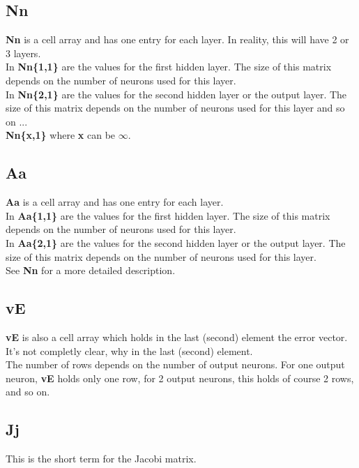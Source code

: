 \subsection{Nn}
\textbf{Nn} is a cell array and has one entry for each layer. In reality, this will have 2 or 3 layers.\\
In \textbf{Nn\{1,1\}} are the values for the first hidden layer. The size of this matrix depends
on the number of neurons used for this layer.\\
In \textbf{Nn\{2,1\}} are the values for the second hidden layer or the output layer. The size of this matrix depends
on the number of neurons used for this layer and so on ...\\
\textbf{Nn\{x,1\}} where \textbf{x} can be $\infty$.\\

\subsection{Aa}
\textbf{Aa} is a cell array and has one entry for each layer.\\
In \textbf{Aa\{1,1\}} are the values for the first hidden layer. The size of this matrix depends
on the number of neurons used for this layer.\\
In \textbf{Aa\{2,1\}} are the values for the second hidden layer or the output layer. The size of this matrix depends
on the number of neurons used for this layer.\\
See \textbf{Nn} for a more detailed description.\\

\subsection{vE}
\textbf{vE} is also a cell array which holds in the last (second) element the error vector. It's not completly clear, why in the last (second) element.\\
The number of rows depends on the number of output neurons. For one output neuron, \textbf{vE} holds only one row, for 2 output neurons, this holds of course 2 rows, and so on. 

\subsection{Jj}
This is the short term for the Jacobi matrix.